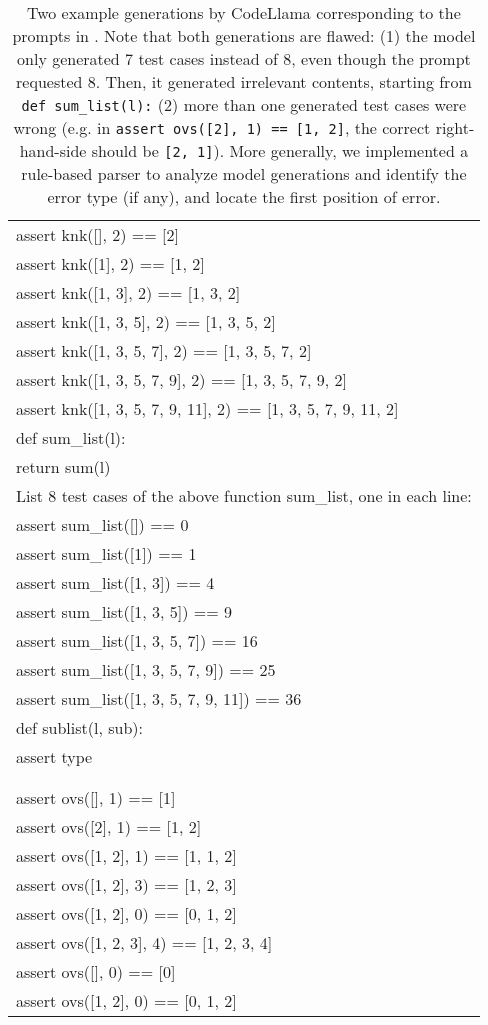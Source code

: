 \begin{table}[t]
\centering
\small
\begin{tabular}{l}
\toprule
assert knk([], 2) == [2] \\
assert knk([1], 2) == [1, 2] \\
assert knk([1, 3], 2) == [1, 3, 2] \\
assert knk([1, 3, 5], 2) == [1, 3, 5, 2] \\
assert knk([1, 3, 5, 7], 2) == [1, 3, 5, 7, 2] \\
assert knk([1, 3, 5, 7, 9], 2) == [1, 3, 5, 7, 9, 2] \\
assert knk([1, 3, 5, 7, 9, 11], 2) == [1, 3, 5, 7, 9, 11, 2] \\
def sum\_list(l): \\
\quad \quad    return sum(l) \\
List 8 test cases of the above function sum\_list, one in each line: \\
assert sum\_list([]) == 0 \\
assert sum\_list([1]) == 1 \\
assert sum\_list([1, 3]) == 4 \\
assert sum\_list([1, 3, 5]) == 9 \\
assert sum\_list([1, 3, 5, 7]) == 16 \\
assert sum\_list([1, 3, 5, 7, 9]) == 25 \\
assert sum\_list([1, 3, 5, 7, 9, 11]) == 36 \\
def sublist(l, sub): \\
\quad \quad    assert type \\
\\
\bottomrule
\\
assert ovs([], 1) == [1] \\
assert ovs([2], 1) == [1, 2] \\
assert ovs([1, 2], 1) == [1, 1, 2] \\
assert ovs([1, 2], 3) == [1, 2, 3] \\
assert ovs([1, 2], 0) == [0, 1, 2] \\
assert ovs([1, 2, 3], 4) == [1, 2, 3, 4] \\
assert ovs([], 0) == [0] \\
assert ovs([1, 2], 0) == [0, 1, 2] \\
\bottomrule
\end{tabular} 
\caption{
Two example generations by CodeLlama corresponding to the prompts in .
Note that both generations are flawed:
(1) the model only generated 7 test cases instead of 8, even though the prompt requested 8.
Then, it generated irrelevant contents,
starting from \texttt{def sum\_list(l):}
(2) more than one generated test cases were wrong
(e.g. in \texttt{assert ovs([2], 1) == [1, 2]}, the correct right-hand-side should be \texttt{[2, 1]}).
More generally, we implemented a rule-based parser to analyze model generations and identify the error type (if any), and locate the first position of error.
}
\label{table:generation_example}
\end{table}







